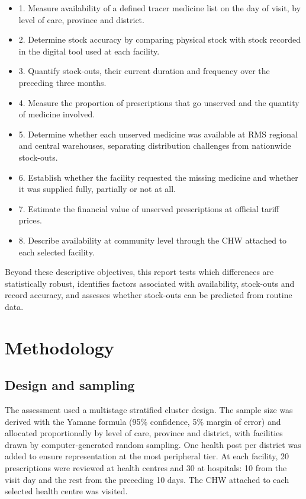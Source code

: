 \documentclass[10pt,a4paper]{report}
\begin{document}
\begin{itemize}\item 1. Measure availability of a defined tracer medicine list on the day of visit, by level of care, province and district.
\item 2. Determine stock accuracy by comparing physical stock with stock recorded in the digital tool used at each facility.
\item 3. Quantify stock-outs, their current duration and frequency over the preceding three months.
\item 4. Measure the proportion of prescriptions that go unserved and the quantity of medicine involved.
\item 5. Determine whether each unserved medicine was available at RMS regional and central warehouses, separating distribution challenges from nationwide stock-outs.
\item 6. Establish whether the facility requested the missing medicine and whether it was supplied fully, partially or not at all.
\item 7. Estimate the financial value of unserved prescriptions at official tariff prices.
\item 8. Describe availability at community level through the CHW attached to each selected facility.
\end{itemize}
Beyond these descriptive objectives, this report tests which differences are statistically robust, identifies factors associated with availability, stock-outs and record accuracy, and assesses whether stock-outs can be predicted from routine data.

\chapter{Methodology}
\section{Design and sampling}
The assessment used a multistage stratified cluster design. The sample size was derived with the Yamane formula (95\% confidence, 5\% margin of error) and allocated proportionally by level of care, province and district, with facilities drawn by computer-generated random sampling. One health post per district was added to ensure representation at the most peripheral tier. At each facility, 20 prescriptions were reviewed at health centres and 30 at hospitals: 10 from the visit day and the rest from the preceding 10 days. The CHW attached to each selected health centre was visited.
\end{document}
